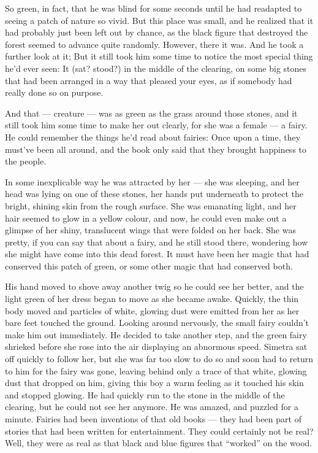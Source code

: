 So green, in fact, that he was blind for some seconds until he had readapted to seeing a patch of nature so vivid. But this place was small, and he realized that it had probably just been left out by chance, as the black figure that destroyed the forest seemed to advance quite randomly. However, there it was. 
And he took a further look at it; But it still took him some time to notice the most special thing he'd ever seen: It (sat? stood?) in the middle of the clearing, on some big stones that had been arranged in a way that pleased your eyes, as if somebody had really done so on purpose.

And that --- creature --- was as green as the grass around those stones, and it still took him some time to make her out clearly, for she was a female --- a fairy. He could remember the things he'd read about fairies: Once upon a time, they must've been all around, and the book only said that they brought happiness to the people.

In some inexplicable way he was attracted by her --- she was sleeping, and her head was lying on one of these stones, her hands put underneath to protect the bright, shining skin from the rough surface. She was emanating light, and her hair seemed to glow in a yellow colour, and now, he could even make out a glimpse of her shiny, translucent wings that were folded on her back. 
She was pretty, if you can say that about a fairy, and he still stood there, wondering how she might have come into this dead forest. It must have been her magic that had conserved this patch of green, or some other magic that had conserved both.

His hand moved to shove away another twig so he could see her better, and the light green of her dress began to move as she became awake. 
Quickly, the thin body moved and particles of white, glowing dust were emitted from her as her bare feet touched the ground. Looking around nervously, the small fairy couldn't make him out immediately. He decided to take another step, and the green fairy shrieked before she rose into the air displaying an abnormous speed. Simetra sat off quickly to follow her, but she was far too slow to do so and soon had to return to him for the fairy was gone, leaving behind only a trace of that white, glowing dust that dropped on him, giving this boy a warm feeling as it touched his skin and stopped glowing. He had quickly run to the stone in the middle of the clearing, but he could not see her anymore. 
He was amazed, and puzzled for a minute. Fairies had been inventions of that old books --- they had been part of stories that had been written for entertainment. They could certainly not be real? Well, they were as real as that black and blue figures that \enquote{worked} on the wood.

